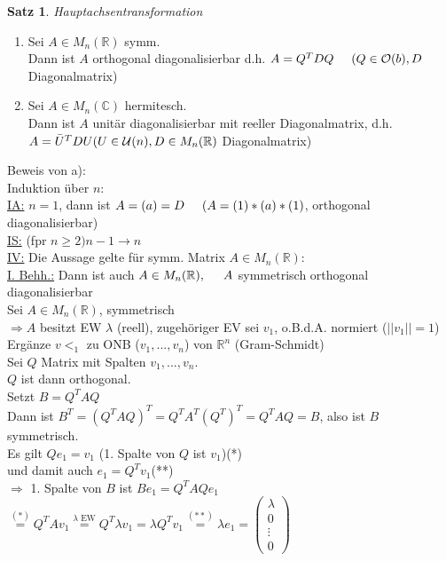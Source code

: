 \documentclass[a4paper,11pt]{article}
\newtheorem{satz}[definition]{Satz}
\newcommand{\hsp}{\hspace{5mm}}
\begin{document}
\begin{satz}
	Hauptachsentransformation
\end{satz}
\begin{enumerate}[label=\alph*)]
	\item Sei $A\in M_n(\mathbb{R})$ symm. \\
	Dann ist $A$ orthogonal diagonalisierbar d.h. $A=Q^TDQ\hsp(Q\in\mathcal{O}(b),D$ Diagonalmatrix)
	\item Sei $A\in M_n(\mathbb{C})$ hermitesch. \\
	Dann ist $A$ unitär diagonalisierbar mit reeller Diagonalmatrix, d.h. $A=\bar U^TDU \\
	(U\in \mathcal{U}(n), D\in M_n(\mathbb{R})$ Diagonalmatrix)
\end{enumerate}
Beweis von a): \\
Induktion über $n$: \\
\underline{IA:} $n=1$, dann ist $A=(a)=D\hsp(A=(1)*(a)*(1)$, orthogonal diagonalisierbar) \\
\underline{IS:} (fpr $n\geq2) n-1\rightarrow n$ \\
\underline{IV:} Die Aussage gelte für symm. Matrix $A\in M_n(\mathbb{R})$: \\
\underline{I. Behh.:} Dann ist auch $A\in M_n(\mathbb{R}),\hsp A$ symmetrisch orthogonal diagonalisierbar \\
Sei $A\in M_n(\mathbb{R})$, symmetrisch \\
$\Rightarrow A$ besitzt EW $\lambda$ (reell), zugehöriger EV sei $v_1$, o.B.d.A. normiert ($\vert\vert v_1\vert\vert=1$) \\
Ergänze $v<_1$ zu ONB ($v_1,...,v_n$) von $\mathbb{R}^n$ (Gram-Schmidt) \\
Sei $Q$ Matrix mit Spalten $v_1,...,v_n$. \\
$Q$ ist dann orthogonal. \\
Setzt $B=Q^TAQ$ \\
Dann ist $B^T=(Q^TAQ)^T=Q^TA^T(Q^T)^T=Q^TAQ=B$, also ist $B$ symmetrisch. \\
Es gilt $Qe_1=v_1$ (1. Spalte von $Q$ ist $v_1$)\hsp(*) \\
und damit auch $e_1=Q^Tv_1$\hsp(**) \\
$\Rightarrow$ 1. Spalte von $B$ ist $Be_1=Q^TAQe_1$ \\
$\overset{(*)}{=}Q^TAv_1\overset{\lambda\text{ EW}}{=}Q^T\lambda v_1=\lambda Q^Tv_1\overset{(**)}{=}\lambda e_1=\begin{pmatrix}\lambda\\0\\\vdots\\0\end{pmatrix}$ \\
\end{document}
